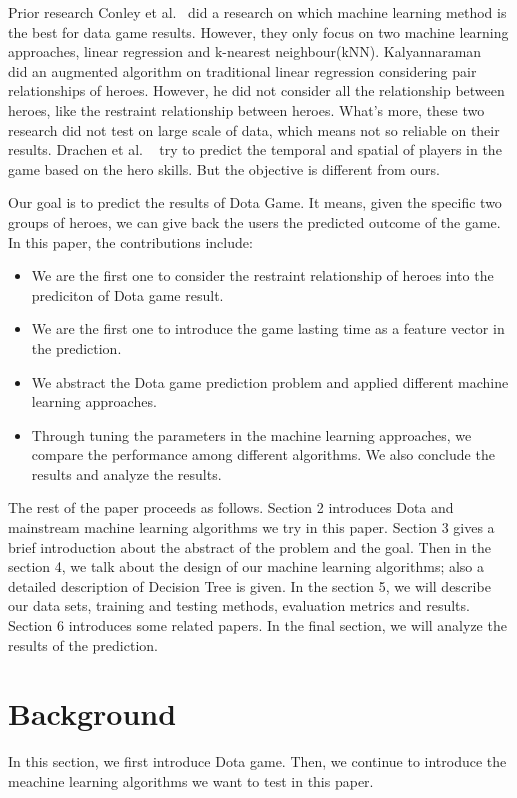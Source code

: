 \documentclass{article}
\begin{document}
Prior research 
Conley et al.~\cite{conley2013does} did a research on which machine learning method is the best for data game results.
However, they only focus on two machine learning approaches, linear regression and k-nearest neighbour(kNN).
Kalyannaraman~\cite{kau2013win} did an augmented algorithm on traditional linear regression considering pair relationships of heroes.
However, he did not consider all the relationship between heroes, like the restraint relationship between heroes.
What's more, these two research did not test on large scale of data, which means not so reliable on their results.
Drachen et al. ~\cite{drachen2014skill} try to predict the temporal and spatial of players in the game based on the hero skills.
But the objective is different from ours. 

Our goal is to predict the results of Dota Game.
It means, given the specific two groups of heroes, we can give back the users the predicted outcome of the game.
In this paper, the contributions include:

\begin{itemize}
\item We are the first one to consider the restraint relationship of heroes into the prediciton of Dota game result. 
\item We are the first one to introduce the game lasting time as a feature vector in the prediction. 
\item We abstract the Dota game prediction problem and applied different machine learning approaches.
\item Through tuning the parameters in the machine learning approaches, we compare the performance among different algorithms. We also conclude the results and analyze the results.
\end{itemize}

The rest of the paper proceeds as follows.
Section 2 introduces Dota and mainstream machine learning algorithms we try in this paper.
Section 3 gives a brief introduction about the abstract of the problem and the goal.
Then in the section 4, we talk about the design of our machine learning algorithms; also a detailed description of Decision Tree is given.
In the section 5, we will describe our data sets, training and testing methods, evaluation metrics and results.
Section 6 introduces some related papers.
In the final section, we will analyze the results of the prediction.

\section{Background}
In this section, we first introduce Dota game.
Then, we continue to introduce the meachine learning algorithms we want to test in this paper. 
\end{document}
